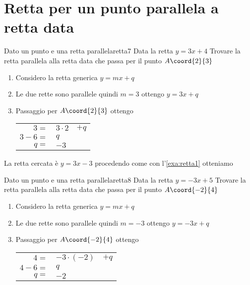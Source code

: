 \section{Retta per un punto parallela a retta data}
\begin{esempiot}{Dato un punto e una retta parallela}{retta7}
	Data la retta $y=3x+4$ Trovare la retta parallela alla retta data che  passa per il punto	$A\coord{2}{3}$
\end{esempiot}
\begin{enumerate}
	\item Considero la retta generica $y=mx+q$
	\item Le due rette sono parallele quindi $m=3$ ottengo $y=3x+q$
	\item Passaggio per $A\coord{2}{3}$ ottengo 
	\begin{tabular}{rll}
	$3=$&$3\cdot 2$&$+q$\\
	$3-6=$&$q$\\
	$q=$&$-3$\\
	\end{tabular}
\end{enumerate}

La retta cercata è $y=3x-3$ procedendo come con l'\cref{exa:retta1}
otteniamo
\begin{center}
	
	\label{fig:disegnoretta7}
\end{center}
\begin{esempiot}{Dato un punto e una retta parallela}{retta8}
	Data la retta $y=-3x+5$ Trovare la retta parallela alla retta data che  passa per il punto	$A\coord{-2}{4}$
\end{esempiot}
\begin{enumerate}
	\item Considero la retta generica $y=mx+q$
	\item Le due rette sono parallele quindi $m=-3$ ottengo $y=-3x+q$
	\item Passaggio per $A\coord{-2}{4}$ ottengo 
	\begin{tabular}{rll}
		$4=$&$-3\cdot (-2)$&$+q$\\
		$4-6=$&$q$\\
		$q=$&$-2$\\
	\end{tabular}
\end{enumerate}


